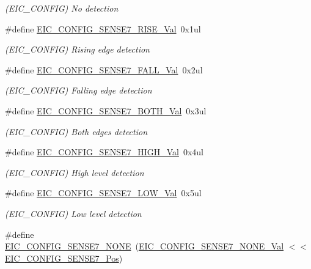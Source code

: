 \begin{DoxyCompactItemize}
\begin{DoxyCompactList}\small\item\em (E\+I\+C\+\_\+\+C\+O\+N\+F\+IG) No detection \end{DoxyCompactList}\item 
\#define \mbox{\hyperlink{group___s_a_m_d21___e_i_c_ga84e2898643261f390c3f329d59357cb6}{E\+I\+C\+\_\+\+C\+O\+N\+F\+I\+G\+\_\+\+S\+E\+N\+S\+E7\+\_\+\+R\+I\+S\+E\+\_\+\+Val}}~0x1ul
\begin{DoxyCompactList}\small\item\em (E\+I\+C\+\_\+\+C\+O\+N\+F\+IG) Rising edge detection \end{DoxyCompactList}\item 
\#define \mbox{\hyperlink{group___s_a_m_d21___e_i_c_ga456906de38943b836b26294cd9735251}{E\+I\+C\+\_\+\+C\+O\+N\+F\+I\+G\+\_\+\+S\+E\+N\+S\+E7\+\_\+\+F\+A\+L\+L\+\_\+\+Val}}~0x2ul
\begin{DoxyCompactList}\small\item\em (E\+I\+C\+\_\+\+C\+O\+N\+F\+IG) Falling edge detection \end{DoxyCompactList}\item 
\#define \mbox{\hyperlink{group___s_a_m_d21___e_i_c_ga461a0f4bd20a83b7c935ba3fb4e640ac}{E\+I\+C\+\_\+\+C\+O\+N\+F\+I\+G\+\_\+\+S\+E\+N\+S\+E7\+\_\+\+B\+O\+T\+H\+\_\+\+Val}}~0x3ul
\begin{DoxyCompactList}\small\item\em (E\+I\+C\+\_\+\+C\+O\+N\+F\+IG) Both edges detection \end{DoxyCompactList}\item 
\#define \mbox{\hyperlink{group___s_a_m_d21___e_i_c_ga90352dd0ca9acbd823c87862d2046489}{E\+I\+C\+\_\+\+C\+O\+N\+F\+I\+G\+\_\+\+S\+E\+N\+S\+E7\+\_\+\+H\+I\+G\+H\+\_\+\+Val}}~0x4ul
\begin{DoxyCompactList}\small\item\em (E\+I\+C\+\_\+\+C\+O\+N\+F\+IG) High level detection \end{DoxyCompactList}\item 
\#define \mbox{\hyperlink{group___s_a_m_d21___e_i_c_ga090c5aaf967e49c1634a02bae7799fa6}{E\+I\+C\+\_\+\+C\+O\+N\+F\+I\+G\+\_\+\+S\+E\+N\+S\+E7\+\_\+\+L\+O\+W\+\_\+\+Val}}~0x5ul
\begin{DoxyCompactList}\small\item\em (E\+I\+C\+\_\+\+C\+O\+N\+F\+IG) Low level detection \end{DoxyCompactList}\item 
\#define \mbox{\hyperlink{group___s_a_m_d21___e_i_c_ga10033675399a7e1ce96cd0adba7969a3}{E\+I\+C\+\_\+\+C\+O\+N\+F\+I\+G\+\_\+\+S\+E\+N\+S\+E7\+\_\+\+N\+O\+NE}}~(\mbox{\hyperlink{group___s_a_m_d21___e_i_c_gad238f5412dacf421dc698fbb1e6be2f2}{E\+I\+C\+\_\+\+C\+O\+N\+F\+I\+G\+\_\+\+S\+E\+N\+S\+E7\+\_\+\+N\+O\+N\+E\+\_\+\+Val}}    $<$$<$ \mbox{\hyperlink{group___s_a_m_d21___e_i_c_ga19583c715708b15f578f5cc2a8f394fc}{E\+I\+C\+\_\+\+C\+O\+N\+F\+I\+G\+\_\+\+S\+E\+N\+S\+E7\+\_\+\+Pos}})
$$
\end{DoxyCompactItemize}

